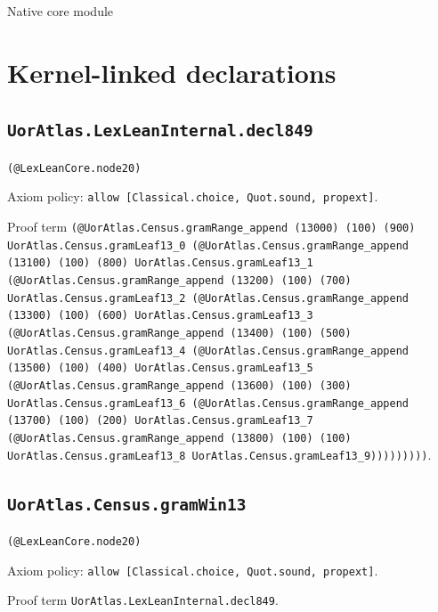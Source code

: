 \documentclass[11pt]{article}
\begin{document}
\begin{center}{\LARGE Native core module}\end{center}
\section*{Kernel-linked declarations}
\subsection*{\texttt{UorAtlas.LexLeanInternal.decl849}}
\noindent\texttt{(@LexLeanCore.node20)}\par
\noindent Axiom policy: \texttt{allow [Classical.choice, Quot.sound, propext]}.\par
\noindent Proof term \texttt{(@UorAtlas.Census.gramRange\_append (13000) (100) (900) UorAtlas.Census.gramLeaf13\_0 (@UorAtlas.Census.gramRange\_append (13100) (100) (800) UorAtlas.Census.gramLeaf13\_1 (@UorAtlas.Census.gramRange\_append (13200) (100) (700) UorAtlas.Census.gramLeaf13\_2 (@UorAtlas.Census.gramRange\_append (13300) (100) (600) UorAtlas.Census.gramLeaf13\_3 (@UorAtlas.Census.gramRange\_append (13400) (100) (500) UorAtlas.Census.gramLeaf13\_4 (@UorAtlas.Census.gramRange\_append (13500) (100) (400) UorAtlas.Census.gramLeaf13\_5 (@UorAtlas.Census.gramRange\_append (13600) (100) (300) UorAtlas.Census.gramLeaf13\_6 (@UorAtlas.Census.gramRange\_append (13700) (100) (200) UorAtlas.Census.gramLeaf13\_7 (@UorAtlas.Census.gramRange\_append (13800) (100) (100) UorAtlas.Census.gramLeaf13\_8 UorAtlas.Census.gramLeaf13\_9)))))))))}.\par
\subsection*{\texttt{UorAtlas.Census.gramWin13}}
\noindent\texttt{(@LexLeanCore.node20)}\par
\noindent Axiom policy: \texttt{allow [Classical.choice, Quot.sound, propext]}.\par
\noindent Proof term \texttt{UorAtlas.LexLeanInternal.decl849}.\par
\end{document}
